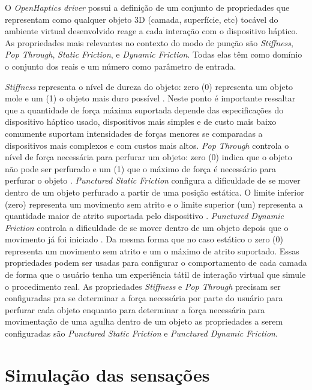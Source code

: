 O \textit{OpenHaptics driver} possui a definição de um conjunto de propriedades que representam como qualquer objeto 3D (camada, superfície, etc) tocável do ambiente virtual desenvolvido reage a cada interação com o dispositivo háptico. As propriedades mais relevantes no contexto do modo de punção são \textit{Stiffness}, \textit{Pop Through}, \textit{Static Friction}, e \textit{Dynamic Friction}. Todas elas têm como domínio o conjunto dos reais e um número como parâmetro de entrada. 

\textit{Stiffness} representa o nível de dureza do objeto: zero (0) representa um objeto mole e um (1) o objeto mais duro possível \cite{3DSystemsTouch2018}. Neste ponto é importante ressaltar que a quantidade de força máxima suportada depende das especificações do dispositivo háptico usado, dispositivos mais simples e de custo mais baixo comumente suportam intensidades de forças menores se comparadas a dispositivos mais complexos e com custos mais altos. \textit{Pop Through} controla o nível de força necessária para perfurar um objeto: zero (0) indica que o objeto não pode ser perfurado e um (1) que o máximo de força é necessário para perfurar o objeto \cite{3DSystemsTouch2018}. \textit{Punctured Static Friction} configura a dificuldade de se mover dentro de um objeto perfurado a partir de uma posição estática. O limite inferior (zero) representa um movimento sem atrito e o limite superior (um) representa a quantidade maior de atrito suportada pelo dispositivo \cite{3DSystemsTouch2018}. \textit{Punctured Dynamic Friction} controla a dificuldade de se mover dentro de um objeto depois que o movimento já foi iniciado \cite{3DSystemsTouch2018}. Da mesma forma que no caso estático o zero (0) representa um movimento sem atrito e um o máximo de atrito suportado. Essas propriedades podem ser usadas para configurar o comportamento de cada camada de forma que o usuário tenha um experiência tátil de interação virtual que simule o procedimento real. As propriedades \textit{Stiffness} e \textit{Pop Through} precisam ser configuradas pra se determinar a força necessária por parte do usuário para perfurar cada objeto enquanto para determinar a força necessária para movimentação de uma agulha dentro de um objeto as propriedades a serem configuradas são \textit{Punctured Static Friction} e \textit{Punctured Dynamic Friction}.

\section{Simulação das sensações}
\label{sec:testeSensacoes}

